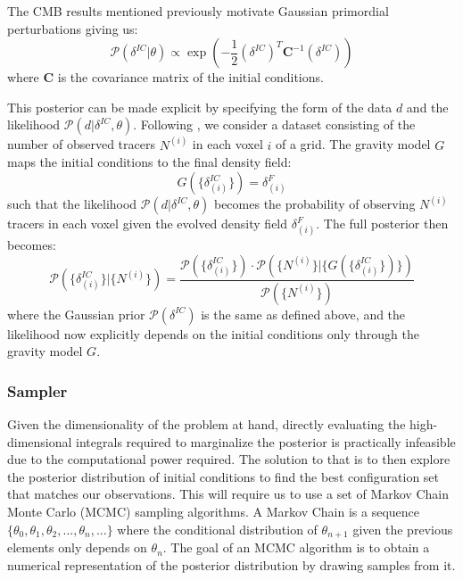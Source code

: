 The CMB results mentioned previously motivate 
Gaussian primordial perturbations giving us: 
\begin{equation}
    \mathcal{P}(\delta^{IC} | \theta) \propto
    \exp\left(-\frac{1}{2}
    \left (\delta^{IC} \right )^T
    \mathbf{C}^{-1}
    \left(\delta^{IC} \right) \right)
\end{equation}
where $\mathbf{C}$ is the covariance matrix of the initial conditions. 

This posterior can be made explicit by specifying the form of the
data $d$ and the likelihood $\mathcal{P}(d|\delta^{IC},\theta)$. Following 
\cite{Jasche_2019}, we consider a dataset consisting of the number of 
observed tracers $N^{(i)}$ in each voxel $i$ of a grid. The gravity 
model $G$ maps the initial conditions to the final density field:
\begin{equation}
    G(\{\delta^{IC}_{(i)}\}) = \delta^F_{(i)}
\end{equation}
such that the likelihood $\mathcal{P}(d|\delta^{IC}, \theta)$ becomes the 
probability of observing $N^{(i)}$ tracers in each voxel given the 
evolved density field $\delta^F_{(i)}$. The full posterior then becomes:
\begin{equation}
    \mathcal{P}(\{\delta^{IC}_{(i)}\} | \{N^{(i)}\}) = 
    \frac{\mathcal{P}(\{\delta^{IC}_{(i)}\}) \cdot 
    \mathcal{P}(\{N^{(i)}\} | \{G(\{\delta^{IC}_{(i)}\})\})}
    {\mathcal{P}(\{N^{(i)}\})}
\end{equation}
where the Gaussian prior $\mathcal{P}(\delta^{IC})$ is the same as 
defined above, and the likelihood now explicitly depends on the initial 
conditions only through the gravity model $G$.

\subsubsection{Sampler} \label{sec:borg_sampler}

Given the dimensionality of the problem at hand, directly evaluating the 
high-dimensional integrals required to marginalize the posterior is 
practically infeasible due to the computational power required. 
The solution to that is to then explore the posterior distribution of initial conditions to find the best configuration set that matches our observations. 
This will require us 
to use a set of Markov Chain Monte Carlo (MCMC) sampling algorithms. 
A Markov Chain is a  sequence $\{ \theta_0, \theta_1, \theta_2, ..., \theta_n, ... \}$ where the conditional distribution of $\theta_{n+1}$ given the previous 
elements 
only depends on $\theta_n$. The goal of an MCMC algorithm is to obtain a numerical representation of the posterior distribution by drawing samples from it. \\

